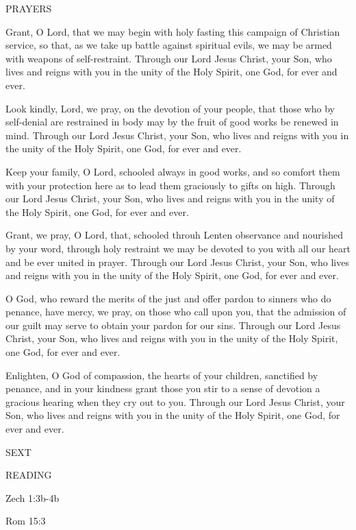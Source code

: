 \noindent\small PRAYERS
\begin{description}[labelindent=\parindent, leftmargin=*]
\item [Ash Wednesday:] 	Grant, O Lord, that we may begin with holy fasting this campaign of Christian service, so that, as we take up battle against spiritual evils, we may be armed with weapons of self-restraint. Through our Lord Jesus Christ, your Son, who lives and reigns with you in the unity of the Holy Spirit, one God, for ever and ever.
\item [Week 1:] 	Look kindly, Lord, we pray, on the devotion of your people, that those who by self-denial are restrained in body may by the fruit of good works be renewed in mind. Through our Lord Jesus Christ, your Son, who lives and reigns with you in the unity of the Holy Spirit, one God, for ever and ever.
\item [Week 2:] 	Keep your family, O Lord, schooled always in good works, and so comfort them with your protection here as to lead them graciously to gifts on high. Through our Lord Jesus Christ, your Son, who lives and reigns with you in the unity of the Holy Spirit, one God, for ever and ever.
\item [Week 3:] 	Grant, we pray, O Lord, that, schooled throuh Lenten observance and nourished by your word, through holy restraint we may be devoted to you with all our heart and be ever united in prayer. Through our Lord Jesus Christ, your Son, who lives and reigns with you in the unity of the Holy Spirit, one God, for ever and ever.
\item [Week 4:] 	O God, who reward the merits of the just and offer pardon to sinners who do penance, have mercy, we pray, on those who call upon you, that the admission of our guilt may serve to obtain your pardon for our sins. Through our Lord Jesus Christ, your Son, who lives and reigns with you in the unity of the Holy Spirit, one God, for ever and ever.
\item [Week 5:] 	Enlighten, O God of compassion, the hearts of your children, sanctified by penance, and in your kindness grant those you stir to a sense of devotion a gracious hearing when they cry out to you. Through our Lord Jesus Christ, your Son, who lives and reigns with you in the unity of the Holy Spirit, one God, for ever and ever.
\end{description}

\begin{flushleft}\normalsize{\uppercase{SEXT\\}}\end{flushleft}
\noindent\small READING
\begin{description}[labelindent=\parindent, leftmargin=*]
\item [Ash Wednesday \& Weeks 1-4:]     Zech 1:3b-4b \textbf{    \\}
\item [Week 5:]    Rom 15:3   \textbf{} 
\end{description}

